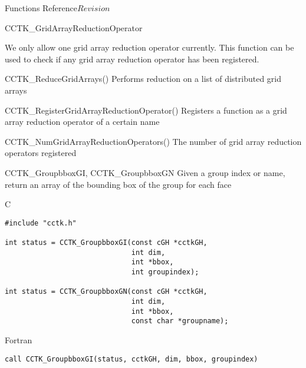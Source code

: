 \begin{cactuspart}{ Functions Reference}{}{$Revision$}
\begin{FunctionDescription}{CCTK\_GridArrayReductionOperator}

\begin{Discussion}
We only allow one grid array reduction operator currently. This function can be used to check if any grid array reduction operator has been registered.
\end{Discussion}

\begin{SeeAlsoSection}
\begin{SeeAlso}{CCTK\_ReduceGridArrays()}
Performs reduction on a list of distributed grid arrays
\end{SeeAlso}

\begin{SeeAlso}{CCTK\_RegisterGridArrayReductionOperator()}
Registers a function as a grid array reduction operator of a certain name
\end{SeeAlso}

\begin{SeeAlso}{CCTK\_NumGridArrayReductionOperators()}
The number of grid array reduction operators registered
\end{SeeAlso}
\end{SeeAlsoSection}
\end{FunctionDescription}


\begin{FunctionDescription}{CCTK\_GroupbboxGI, CCTK\_GroupbboxGN}
\label{CCTK-GroupbboxGI}
\label{CCTK-GroupbboxGN}
Given a group index or name, return an array of the bounding box of the group for each face

\begin{SynopsisSection}
\begin{Synopsis}{C}
\begin{verbatim}
#include "cctk.h"

int status = CCTK_GroupbboxGI(const cGH *cctkGH,
                              int dim,
                              int *bbox,
                              int groupindex);

int status = CCTK_GroupbboxGN(const cGH *cctkGH,
                              int dim,
                              int *bbox,
                              const char *groupname);
\end{verbatim}
\end{Synopsis}
\begin{Synopsis}{Fortran}
\begin{verbatim}
call CCTK_GroupbboxGI(status, cctkGH, dim, bbox, groupindex)


\end{verbatim}
\end{Synopsis}
\end{SynopsisSection}
\end{FunctionDescription}
\end{cactuspart}
